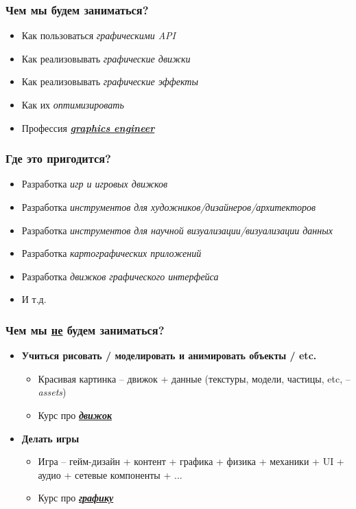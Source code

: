 \documentclass[10pt]{beamer}
\begin{document}
\begin{frame}
\frametitle{Чем мы будем заниматься?}
\begin{itemize}
\pause
\item Как пользоваться \textit{графическими API}
\pause
\item Как реализовывать \textit{графические движки}
\pause
\item Как реализовывать \textit{графические эффекты}
\pause
\item Как их \textit{оптимизировать}
\pause
\item Профессия \alert{\textbf{\textit{\underline{graphics engineer}}}}
\end{itemize}
\end{frame}

\begin{frame}
\frametitle{Где это пригодится?}
\begin{itemize}
\pause
\item Разработка \textit{игр и игровых движков}
\pause
\item Разработка \textit{инструментов для художников/дизайнеров/архитекторов}
\pause
\item Разработка \textit{инструментов для научной визуализации/визуализации данных}
\pause
\item Разработка \textit{картографических приложений}
\pause
\item Разработка \textit{движков графического интерфейса}
\pause
\item И т.д.
\end{itemize}
\end{frame}

\begin{frame}
\frametitle{Чем мы \underline{не} будем заниматься?}
\begin{itemize}
\pause
\item \textbf{Учиться рисовать / моделировать и анимировать объекты / etc.}
\pause
\begin{itemize}
\item Красивая картинка -- движок + данные (текстуры, модели, частицы, etc, -- \textit{assets})
\item Курс про \alert{\textbf{\underline{\textit{движок}}}}
\end{itemize}
\pause
\item \textbf{Делать игры}
\begin{itemize}
\item Игра -- гейм-дизайн + контент + графика + физика + механики + UI + аудио + сетевые компоненты + ...
\item Курс про \alert{\textbf{\underline{\textit{графику}}}}
\end{itemize}
\end{itemize}
\end{frame}
\end{document}
